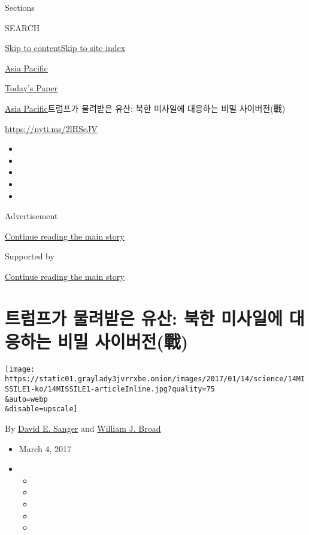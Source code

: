 Sections

SEARCH

\protect\hyperlink{site-content}{Skip to
content}\protect\hyperlink{site-index}{Skip to site index}

\href{https://www.nytimes3xbfgragh.onion/section/world/asia}{Asia
Pacific}

\href{https://myaccount.nytimes3xbfgragh.onion/auth/login?response_type=cookie\&client_id=vi}{}

\href{https://www.nytimes3xbfgragh.onion/section/todayspaper}{Today's
Paper}

\href{/section/world/asia}{Asia Pacific}\textbar{}트럼프가 물려받은
유산: 북한 미사일에 대응하는 비밀 사이버전(戰)

\url{https://nyti.ms/2lHSeJV}

\begin{itemize}
\item
\item
\item
\item
\item
\end{itemize}

Advertisement

\protect\hyperlink{after-top}{Continue reading the main story}

Supported by

\protect\hyperlink{after-sponsor}{Continue reading the main story}

\hypertarget{uxd2b8uxb7fcuxd504uxac00-uxbb3cuxb824uxbc1buxc740-uxc720uxc0b0-uxbd81uxd55c-uxbbf8uxc0acuxc77cuxc5d0-uxb300uxc751uxd558uxb294-uxbe44uxbc00-uxc0acuxc774uxbc84uxc804ux6230}{%
\section{트럼프가 물려받은 유산: 북한 미사일에 대응하는 비밀
사이버전(戰)}\label{uxd2b8uxb7fcuxd504uxac00-uxbb3cuxb824uxbc1buxc740-uxc720uxc0b0-uxbd81uxd55c-uxbbf8uxc0acuxc77cuxc5d0-uxb300uxc751uxd558uxb294-uxbe44uxbc00-uxc0acuxc774uxbc84uxc804ux6230}}

\texttt{[image: https://static01.graylady3jvrrxbe.onion/images/2017/01/14/science/14MISSILE1-ko/14MISSILE1-articleInline.jpg?quality=75\\\&auto=webp\\\&disable=upscale]}

By \href{http://www.nytimes3xbfgragh.onion/by/david-e-sanger}{David E.
Sanger} and
\href{http://www.nytimes3xbfgragh.onion/by/william-j-broad}{William J.
Broad}

\begin{itemize}
\item
  March 4, 2017
\item
  \begin{itemize}
  \item
  \item
  \item
  \item
  \item
  \end{itemize}
\end{itemize}

